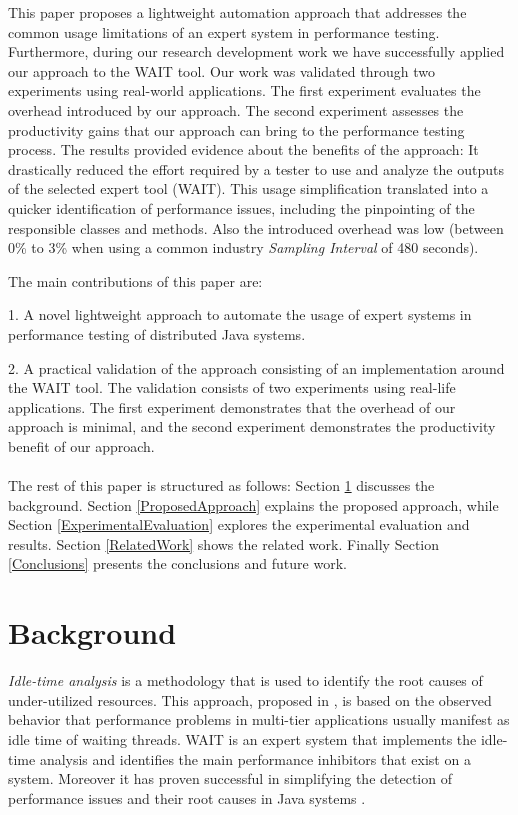 \documentclass[runningheads,a4paper]{llncs}
\begin{document}
This paper proposes a lightweight automation approach that addresses the common
usage limitations of an expert system in performance testing. Furthermore,
during our research development work we have successfully applied our approach
to the WAIT tool. Our work was validated through two experiments using
real-world applications. The first experiment evaluates the overhead introduced
by our approach. The second experiment assesses the productivity gains that our
approach can bring to the performance testing process. The results provided evidence 
about the benefits of the approach: It drastically reduced the effort required by a
tester to use and analyze the outputs of the selected expert tool (WAIT). This
usage simplification translated into a quicker identification of performance issues, 
including the pinpointing of the responsible classes and methods. Also the
introduced overhead was low (between 0\% to 3\% when using a common industry
\emph{Sampling Interval} of 480 seconds).

The main contributions of this paper are: 

1. A novel lightweight approach to automate the usage of expert systems in
performance testing of distributed Java systems.

2. A practical validation of the approach consisting of an implementation
around the WAIT tool. The validation consists of two experiments using
real-life applications. The first experiment demonstrates that the overhead of
our approach is minimal, and the second experiment demonstrates the productivity
benefit of our approach.
\\\\
The rest of this paper is structured as follows: Section \ref{Background}
discusses the background. Section \ref{ProposedApproach} explains the proposed
approach, while Section \ref{ExperimentalEvaluation} explores the experimental 
evaluation and results. Section \ref{RelatedWork} shows the related work.
Finally Section \ref{Conclusions} presents the conclusions and future work.


\vspace{-7pt}
\section{Background}
\label{Background}
\vspace{-7pt}
\emph{Idle-time analysis} is a methodology that is used to identify the root
causes of under-utilized resources. This approach, proposed in
\cite{Altman2010}, is based on the observed behavior that performance problems in multi-tier
applications usually manifest as idle time of waiting threads.
WAIT is an expert system that implements the idle-time analysis and identifies
the main performance inhibitors that exist on a system. Moreover it has proven successful in simplifying the detection of performance issues and their root causes in Java
systems \cite{Altman2010,Wu1}.
\end{document}
